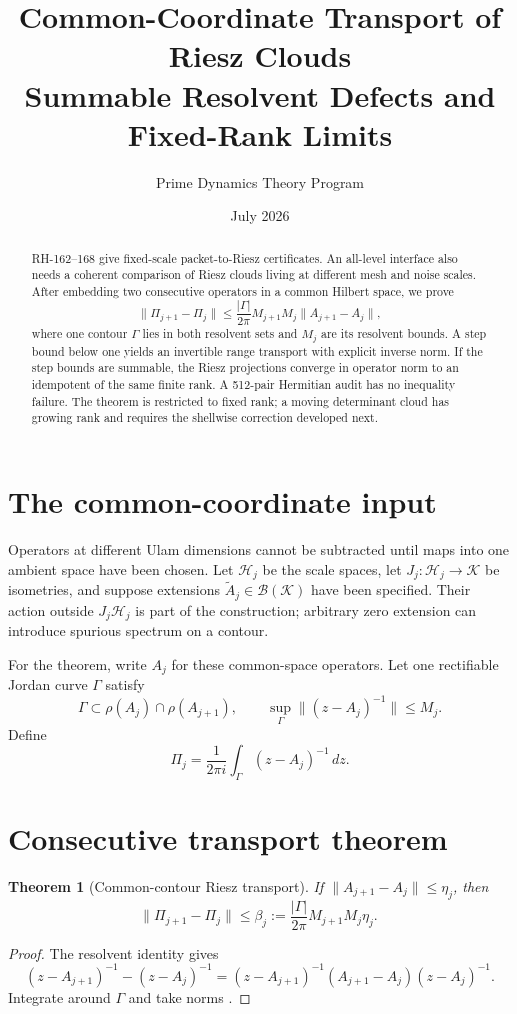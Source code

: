 \documentclass[12pt]{article}
\title{Common-Coordinate Transport of Riesz Clouds\\\large Summable Resolvent Defects and Fixed-Rank Limits}
\author{Prime Dynamics Theory Program}
\date{July 2026}
\newtheorem{theorem}{Theorem}
\newcommand{\norm}[1]{\lVert#1\rVert}
\begin{document}
\maketitle
\begin{abstract}
RH-162--168 give fixed-scale packet-to-Riesz certificates.  An all-level
interface also needs a coherent comparison of Riesz clouds living at
different mesh and noise scales.  After embedding two consecutive operators
in a common Hilbert space, we prove
\[
 \norm{\Pi_{j+1}-\Pi_j}
 \le\frac{|\Gamma|}{2\pi}M_{j+1}M_j
 \norm{A_{j+1}-A_j},
\]
where one contour $\Gamma$ lies in both resolvent sets and $M_j$ are its
resolvent bounds.  A step bound below one yields an invertible range
transport with explicit inverse norm.  If the step bounds are summable, the
Riesz projections converge in operator norm to an idempotent of the same
finite rank.  A 512-pair Hermitian audit has no inequality failure.  The
theorem is restricted to fixed rank; a moving determinant cloud has growing
rank and requires the shellwise correction developed next.
\end{abstract}

\section{The common-coordinate input}
Operators at different Ulam dimensions cannot be subtracted until maps into
one ambient space have been chosen.  Let $\mathcal H_j$ be the scale spaces,
let $J_j:\mathcal H_j\to\mathcal K$ be isometries, and suppose extensions
$\widetilde A_j\in\mathcal B(\mathcal K)$ have been specified.  Their action
outside $J_j\mathcal H_j$ is part of the construction; arbitrary zero
extension can introduce spurious spectrum on a contour.

For the theorem, write $A_j$ for these common-space operators.  Let one
rectifiable Jordan curve $\Gamma$ satisfy
\[
 \Gamma\subset\rho(A_j)\cap\rho(A_{j+1}),\qquad
 \sup_\Gamma\norm{(z-A_j)^{-1}}\le M_j.
\]
Define
\[
 \Pi_j=\frac1{2\pi i}\int_\Gamma(z-A_j)^{-1}\,dz.
\]

\section{Consecutive transport theorem}
\begin{theorem}[Common-contour Riesz transport]\label{thm:step}
If $\norm{A_{j+1}-A_j}\le\eta_j$, then
\[
 \boxed{
 \norm{\Pi_{j+1}-\Pi_j}
 \le \beta_j:=\frac{|\Gamma|}{2\pi}M_{j+1}M_j\eta_j.
 \ }
\]
\end{theorem}
\begin{proof}
The resolvent identity gives
\[
 (z-A_{j+1})^{-1}-(z-A_j)^{-1}
 =(z-A_{j+1})^{-1}(A_{j+1}-A_j)(z-A_j)^{-1}.
\]
Integrate around $\Gamma$ and take norms \citep{Kato1995}.
\end{proof}
\end{document}
